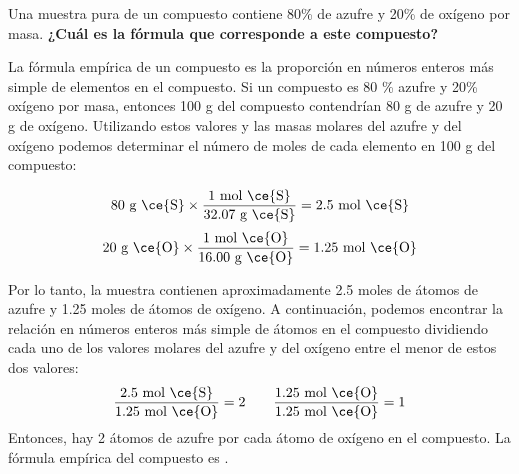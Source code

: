 Una muestra pura de un compuesto contiene 80\% de azufre y 20\% de oxígeno por masa.
\textbf{¿Cuál es la fórmula que corresponde a este compuesto?}

\begin{oneparchoices}
    \choice {}
    \choice {}
    \CorrectChoice {}
    \choice {}
\end{oneparchoices}

\begin{solutionbox}{8cm}
    La fórmula empírica de un compuesto es la proporción en números enteros más simple de elementos en el compuesto.
    Si un compuesto es 80 \% azufre y 20\% oxígeno por masa, entonces 100 g del compuesto contendrían 80 g de azufre y 20 g de oxígeno. Utilizando estos valores y las masas molares del azufre y del oxígeno podemos determinar el número de moles de cada elemento en 100 g del compuesto:

    \[80 \text{ g \ce{S}} \times \frac{1 \text{ mol \ce{S}}}{32.07 \text{ g \ce{S}}} = 2.5 \text{ mol \ce{S}} \]
    \[20 \text{ g \ce{O}} \times \frac{1 \text{ mol \ce{O}}}{16.00 \text{ g \ce{O}}} = 1.25 \text{ mol \ce{O}} \]

    Por lo tanto, la muestra contienen aproximadamente
    2.5 moles de átomos de azufre y 1.25 moles de átomos de oxígeno.
    A continuación, podemos encontrar la relación en números enteros más simple de átomos en el compuesto dividiendo cada uno de los valores molares del azufre y del oxígeno entre el menor de estos dos valores:
    \[ \frac{2.5 \text{ mol \ce{S}}}{1.25 \text{ mol \ce{O}}} = 2 \qquad \frac{1.25 \text{ mol \ce{O}}}{1.25 \text{ mol \ce{O}}} = 1 \]
    Entonces, hay 2 átomos de azufre por cada átomo de oxígeno en el compuesto.
    La fórmula empírica del compuesto es .
\end{solutionbox}